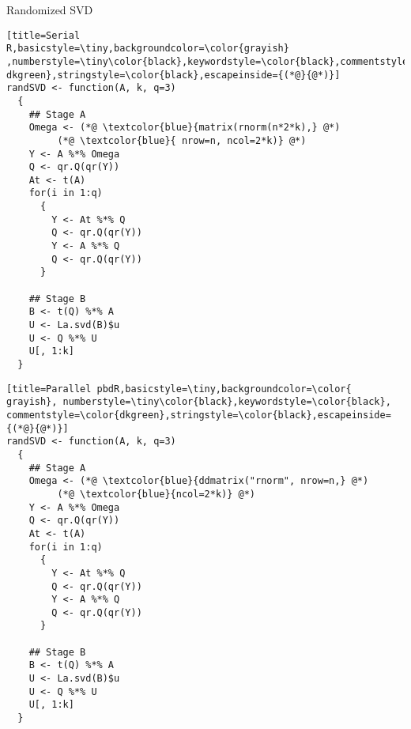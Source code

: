\begin{frame}[fragile]
 \fontsize{8pt}{10}\selectfont
\begin{block}{Randomized SVD}
  \hspace{.1cm}
  \begin{minipage}{0.475\textwidth}
\begin{lstlisting}[title=Serial 
R,basicstyle=\tiny,backgroundcolor=\color{grayish} 
,numberstyle=\tiny\color{black},keywordstyle=\color{black},commentstyle=\color{ 
dkgreen},stringstyle=\color{black},escapeinside={(*@}{@*)}]
randSVD <- function(A, k, q=3)
  {
    ## Stage A
    Omega <- (*@ \textcolor{blue}{matrix(rnorm(n*2*k),} @*) 
         (*@ \textcolor{blue}{ nrow=n, ncol=2*k)} @*)
    Y <- A %*% Omega
    Q <- qr.Q(qr(Y))
    At <- t(A)
    for(i in 1:q)
      {
        Y <- At %*% Q
        Q <- qr.Q(qr(Y))
        Y <- A %*% Q
        Q <- qr.Q(qr(Y))
      }
    
    ## Stage B
    B <- t(Q) %*% A
    U <- La.svd(B)$u
    U <- Q %*% U
    U[, 1:k]
  }
\end{lstlisting}
  \end{minipage}
  \hspace{.05cm}
  \begin{minipage}{0.475\textwidth}
\begin{lstlisting}[title=Parallel pbdR,basicstyle=\tiny,backgroundcolor=\color{
grayish}, numberstyle=\tiny\color{black},keywordstyle=\color{black},
commentstyle=\color{dkgreen},stringstyle=\color{black},escapeinside={(*@}{@*)}]
randSVD <- function(A, k, q=3)
  {
    ## Stage A
    Omega <- (*@ \textcolor{blue}{ddmatrix("rnorm", nrow=n,} @*)
         (*@ \textcolor{blue}{ncol=2*k)} @*)
    Y <- A %*% Omega
    Q <- qr.Q(qr(Y))
    At <- t(A)      
    for(i in 1:q)
      {
        Y <- At %*% Q   
        Q <- qr.Q(qr(Y))
        Y <- A %*% Q    
        Q <- qr.Q(qr(Y))
      }
    
    ## Stage B
    B <- t(Q) %*% A     
    U <- La.svd(B)$u 
    U <- Q %*% U     
    U[, 1:k]
  }
\end{lstlisting}
  \end{minipage}
\end{block}
\end{frame}

